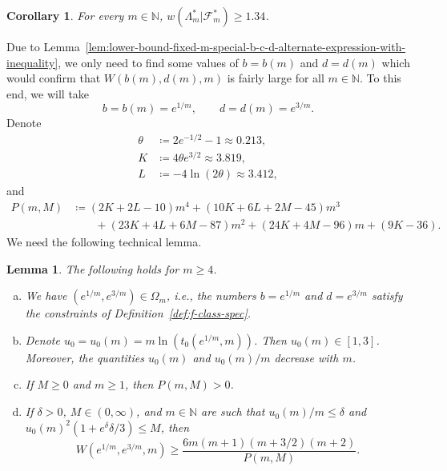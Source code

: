 \documentclass[a4paper]{amsart} %
\newtheorem{lemma}[theorem]{Lemma}
\newtheorem{corollary}[theorem]{Corollary} %
\theoremstyle{definition}
\theoremstyle{remark}
\numberwithin{equation}{section}
\newcommand*{\NN}{\mathbb{N}}
\newcommand*{\weakconstrestricted}[2]{w(#1|#2)} %
\newcommand*{\fclassspecStar}[1]{\mathcal{F}_{#1}^*}
\newcommand*{\specialbd}[1]{\Omega_{#1}}
\newcommand*{\XXXspecialbd}{W}
\begin{document}
\begin{corollary}
	For every $m\in\NN$, $\weakconstrestricted{\Lambda_m^*}{\fclassspecStar{m}} \geq 1.34$.
\end{corollary}

Due to Lemma~\ref{lem:lower-bound-fixed-m-special-b-c-d-alternate-expression-with-inequality},
we only need to find some values of $b=b(m)$ and $d=d(m)$
which would confirm that $\XXXspecialbd(b(m), d(m),m)$
is fairly large for all $m\in \NN$. 
To this end, we will take
\[
b =b(m)= e^{1/m}, \qquad d = d(m) =e^{3/m}.
\]
Denote
\begin{align*}
\theta &\coloneqq   2 e^{-1/2}  - 1 \approx 0.213,\\
K &\coloneqq 4\theta e^{3/2} \approx 3.819, \\
L &\coloneqq -4\ln(2\theta) \approx 3.412, %
\end{align*}
and 
\begin{align*}
P(m,M) &\coloneqq (2K+2L -10) m^4
+ (10K+6L+2M -45) m^3\\
&\qquad+ (23 K + 4 L +  6 M -87) m^2
+ (24K + 4M - 96) m
+ (9K - 36).
\end{align*}
We need the following technical lemma.

\begin{lemma}
	\label{lem:technical-m-large-Taylor}
	The following holds for $m\geq 4$.
	\begin{enumerate}[a)]
		\item
		\label{item:Taylor-constraints}
		We have $(e^{1/m}, e^{3/m}) \in \specialbd{m}$, i.e., 
		the numbers $b=e^{1/m}$ and $d=e^{3/m}$ satisfy the constraints of Definition~\ref{def:f-class-spec}.
		\item
		\label{item:Taylor-uZero}
		Denote $u_0 = u_0(m) = m\ln(t_0(e^{1/m},m))$.
		Then $u_0(m)\in [1,3]$.
		Moreover, the quantities  $u_0(m)$ and $ u_0(m)/m$  decrease with $m$.
		\item
		\label{item:Taylor-coefficients_of_P}
		If $M\geq 0$ and $m\geq 1$, then $P(m, M) > 0 $.
		\item 
		\label{item:Taylor-estimate}
		If $\delta>0$, $M\in(0,\infty)$, and $m\in\NN$ are such that
		$
		u_0(m)/m \leq \delta$
		and 
		$u_0(m)^2 (1+ e^\delta \delta/3) \leq M$,
		then
		\[
		\XXXspecialbd(e^{1/m},e^{3/m},m) \geq \frac{6m(m+1)(m+3/2)(m+2)}{P(m,M)}.
		\]
	\end{enumerate}
\end{lemma}
\end{document}
